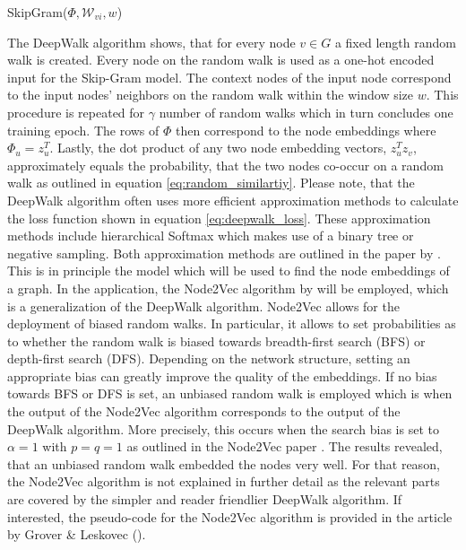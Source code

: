	\begin{algorithm}
		\scriptsize
		\SetAlgoLined
		\nl {}
		\caption{SkipGram($\Phi,\mathcal{W}_{vi},w$)}
		\label{algo:SkipGram}
	\end{algorithm}
	
	\vspace{5mm}
	
	\noindent The DeepWalk algorithm shows, that for every node $v\in G$ a
	fixed length random walk is created. Every node on the random walk is used
	as a one-hot encoded input for the Skip-Gram model. The context nodes of the
	input node correspond to the input nodes' neighbors on the random walk 
	within the window size $w$. This procedure is repeated for $\gamma$ 
	number of random walks which in turn concludes one training epoch. The rows
	of $\Phi$ then correspond to the node embeddings where
	$\Phi_{u}=z_{u}^{T}$. Lastly, the dot product of any two node embedding
	vectors, $z_{u}^{T}z_{v}$, approximately equals the probability, that the
	two nodes co-occur on a random walk as outlined in equation 
	\ref{eq:random_similartiy}. Please note, that the DeepWalk algorithm often 
	uses more efficient approximation methods to calculate the loss function
	shown in equation \ref{eq:deepwalk_loss}. These approximation methods
	include hierarchical Softmax which makes use of a binary tree or negative 
	sampling. Both approximation methods are outlined in the paper by 
	\cite{mikolov2013distributed}. \\

	\noindent This is in principle the model which will be used to find the node
	embeddings of a graph. In the application, the Node2Vec algorithm by
	\cite{grover2016node2vec} will be employed, which is a generalization of 
	the DeepWalk algorithm. Node2Vec allows for the deployment of biased random 
	walks. In particular, it allows to set probabilities as to whether the 
	random walk is biased towards breadth-first search (BFS) or depth-first 
	search (DFS). Depending on the network structure, setting an appropriate 
	bias can greatly improve the quality of the embeddings. If no bias towards 
	BFS or DFS is set, an unbiased random walk is employed which is when
	the output of the Node2Vec algorithm corresponds to the output of the 
	DeepWalk algorithm. More precisely, this occurs when the search bias is set
	to $\alpha = 1$ with $p=q=1$ as outlined in the Node2Vec paper 
	\citep[p. 860]{grover2016node2vec}. The results revealed, that an unbiased 
	random walk embedded the nodes very well. For that reason, the Node2Vec 
	algorithm is not explained in further detail as the relevant parts are 
	covered by the simpler and reader friendlier DeepWalk algorithm. If
	interested, the pseudo-code for the Node2Vec algorithm is provided in the 
	article by Grover \& Leskovec (\citeyear[p. 859]{grover2016node2vec}). \\

